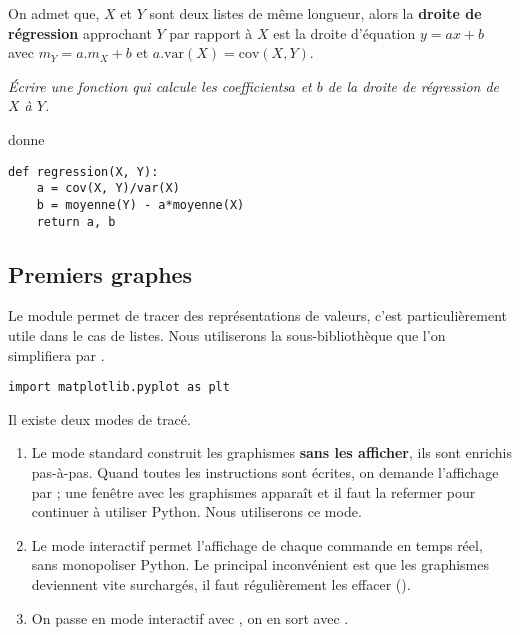 On admet que, $X$ et $Y$ sont deux listes de même longueur, alors la {\bf droite de régression} approchant $Y$ par rapport à $X$ est la droite d'équation $y = ax+b$ avec $m_Y = a.m_X + b$ et $a.\text{var}(X)=\text{cov}(X, Y)$.
\begin{Exercise}[title = Droite de régression]
\it Écrire une fonction  qui calcule les coefficients$a$ et $b$ de la droite de régression de $X$ à $Y$.

 donne 
\end{Exercise}
\begin{Answer}
\begin{lstlisting}
def regression(X, Y):
    a = cov(X, Y)/var(X)
    b = moyenne(Y) - a*moyenne(X)
    return a, b
\end{lstlisting}
\end{Answer}
\subsection{Premiers graphes} 
Le module  permet de tracer des représentations de valeurs, c'est particulièrement utile dans le cas de listes. Nous utiliserons la sous-bibliothèque  que l'on simplifiera par .
\begin{lstlisting}
import matplotlib.pyplot as plt
\end{lstlisting}

Il existe deux modes de tracé.
\begin{enumerate}
    \item Le mode standard construit les graphismes {\bf sans les afficher}, ils sont enrichis pas-à-pas. Quand toutes les instructions sont écrites, on demande l'affichage par  ; une fenêtre avec les graphismes apparaît et il faut la refermer pour continuer à utiliser Python. Nous utiliserons ce mode.
    \item Le mode interactif permet l'affichage de chaque commande en temps réel, sans monopoliser Python. Le principal inconvénient est que les graphismes deviennent vite surchargés, il faut régulièrement les effacer (). 
    \item On passe en mode interactif avec , on en sort avec .
\end{enumerate}

